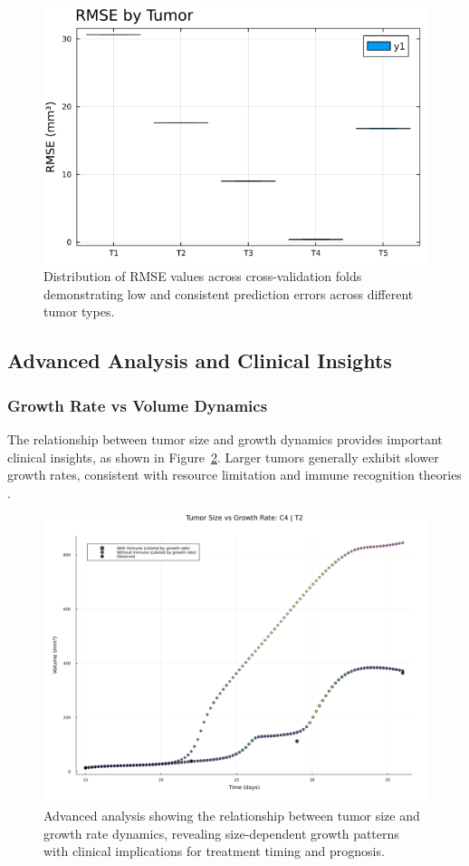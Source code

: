 \documentclass{juliacon}
\begin{document}
\begin{figure}[H]\centering
\includegraphics[width=0.8\linewidth]{rmse_summary.png}
\caption{Distribution of RMSE values across cross-validation folds demonstrating low and consistent prediction errors across different tumor types.}
\label{fig:rmse_distribution}
\end{figure}

\subsection{Advanced Analysis and Clinical Insights}

\subsubsection{Growth Rate vs Volume Dynamics}

The relationship between tumor size and growth dynamics provides important clinical insights, as shown in Figure~\ref{fig:size_growth}. Larger tumors generally exhibit slower growth rates, consistent with resource limitation and immune recognition theories \cite{ji2021autonomous}.

\begin{figure}[H]\centering
\includegraphics[width=\linewidth]{size_vs_growth_rate.png}
\caption{Advanced analysis showing the relationship between tumor size and growth rate dynamics, revealing size-dependent growth patterns with clinical implications for treatment timing and prognosis.}
\label{fig:size_growth}
\end{figure}
\end{document}
